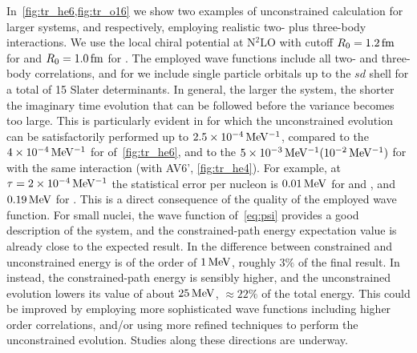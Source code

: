 \documentclass[aps,prc,twocolumn,superscriptaddress,floatfix]{revtex4-1}
\begin{document}
In~\cref{fig:tr_he6,fig:tr_o16} we show two examples of unconstrained calculation for larger systems,
 and  respectively, employing realistic two- plus three-body interactions. 
We use the local chiral potential at N$^2$LO with cutoff $R_0=1.2\,\rm fm$ for 
 and $R_0=1.0\,\rm fm$ for . The employed wave functions include 
all two- and three-body correlations, and for  we include single particle orbitals 
up to the $sd$ shell for a total of 15 Slater determinants. In general, the larger the system, the shorter 
the imaginary time evolution that can be followed before the variance becomes 
too large. 
This is particularly evident in  for which the unconstrained evolution 
can be satisfactorily performed up to $2.5\times10^{-4}\,\rm MeV^{-1}$, 
compared to the $4\times10^{-4}\,\rm MeV^{-1}$
for  of~\cref{fig:tr_he6}, and to the $5\times10^{-3}\,\rm MeV^{-1}(10^{-2}\,\rm MeV^{-1})$ 
for  with the same interaction (with AV6', \cref{fig:tr_he4}).
For example, at $\tau=2\times10^{-4}\,\rm MeV^{-1}$ the statistical error per nucleon is  
$0.01\,\rm MeV$ for  and , and $0.19\,\rm MeV$ for .
This is a direct consequence of the quality of the employed wave function. 
For small nuclei, the wave function of~\cref{eq:psi} provides a good description of the
system, and the constrained-path energy expectation value is already close to the expected result. 
In  the difference between constrained and unconstrained energy is of 
the order of $1\,\rm MeV$, roughly $3\%$ of the final result. 
In  instead, the constrained-path energy is sensibly higher, 
and the unconstrained evolution lowers 
its value of about $25\,\rm MeV$, $\approx22\%$ of the total energy.
This could be improved by employing more sophisticated wave functions including higher order
correlations, and/or using more refined techniques to perform the unconstrained evolution. 
Studies along these directions are underway.
\end{document}
